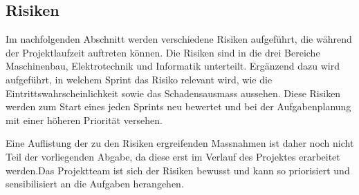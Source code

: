 \documentclass[main.tex]{subfiles} %
\begin{document}
\setcounter{counter}{0}

\subsection{Risiken}

Im nachfolgenden Abschnitt werden verschiedene Risiken aufgeführt, die während
der Projektlaufzeit auftreten können. Die Risiken sind in die drei Bereiche
Maschinenbau, Elektrotechnik und Informatik unterteilt. Ergänzend dazu wird
aufgeführt, in welchem Sprint das Risiko relevant wird, wie die
Eintrittswahrscheinlichkeit sowie das Schadensausmass aussehen. Diese Risiken
werden zum Start eines jeden Sprints neu bewertet und bei der Aufgabenplanung
mit einer höheren Priorität versehen.

Eine Auflistung der zu den Risiken ergreifenden Massnahmen ist daher noch nicht
Teil der vorliegenden Abgabe, da diese erst im Verlauf des Projektes erarbeitet
werden.Das Projektteam ist sich der Risiken bewusst und kann so priorisiert und
sensibilisiert an die Aufgaben herangehen.
\end{document}
